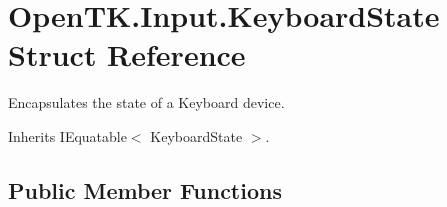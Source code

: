 \hypertarget{struct_open_t_k_1_1_input_1_1_keyboard_state}{\section{Open\-T\-K.\-Input.\-Keyboard\-State Struct Reference}
\label{struct_open_t_k_1_1_input_1_1_keyboard_state}
}


Encapsulates the state of a Keyboard device.  




Inherits I\-Equatable$<$ Keyboard\-State $>$.

\subsection*{Public Member Functions}

